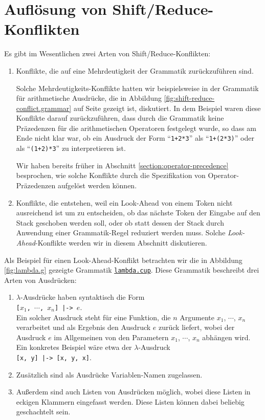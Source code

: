\section{Aufl\"osung von Shift/Reduce-Konflikten}
Es gibt im Wesentlichen zwei Arten von Shift/Reduce-Konflikten:
\begin{enumerate}
\item Konflikte, die auf eine Mehrdeutigkeit der Grammatik zur\"uckzuf\"uhren sind.

      Solche Mehrdeutigkeits-Konflikte hatten wir beispielsweise in der Grammatik f\"ur arithmetische
      Ausdr\"ucke, die in Abbildung \ref{fig:shift-reduce-conflict.grammar} auf Seite
      \pageref{fig:shift-reduce-conflict.grammar} gezeigt ist, diskutiert.  In dem Beispiel waren
      diese Konflikte darauf zur\"uckzuf\"uhren, dass durch die Grammatik keine Pr\"azedenzen f\"ur die
      arithmetischen Operatoren festgelegt wurde, so dass am Ende nicht klar war, ob ein Ausdruck
      der Form ``\texttt{1+2*3}'' als ``\texttt{1+(2*3)}'' oder als ``\texttt{(1+2)*3}'' zu
      interpretieren ist.

      Wir haben bereits fr\"uher in Abschnitt \ref{section:operator-precedence} besprochen, wie solche
      Konflikte durch die Spezifikation von Operator-Pr\"azedenzen aufgel\"ost werden k\"onnen.
\item Konflikte, die entstehen, weil ein Look-Ahead von einem Token nicht ausreichend ist um zu
      entscheiden, ob das n\"achste Token der Eingabe auf den Stack geschoben werden soll, oder 
      ob statt dessen der Stack durch Anwendung einer Grammatik-Regel reduziert werden muss.
      Solche \emph{Look-Ahead}-Konflikte   werden wir in diesem Abschnitt diskutieren.
\end{enumerate}
Als Beispiel f\"ur einen Look-Ahead-Konflikt betrachten wir die in Abbildung \ref{fig:lambda.g}
gezeigte Grammatik
\href{https://github.com/karlstroetmann/Formal-Languages/tree/master/Cup/LambdaExpr/lambda.cup}{\texttt{lambda.cup}}.  
Diese Grammatik beschreibt drei Arten von Ausdr\"ucken:
\begin{enumerate}
\item $\lambda$-Ausdr\"ucke haben syntaktisch die Form
      \\[0.2cm]
      \hspace*{1.3cm}
      \texttt{[$x_1$, $\cdots$, $x_n$] |-> $e$}.
      \\[0.2cm]
      Ein solcher Ausdruck steht f\"ur eine Funktion, die $n$ Argumente $x_1$, $\cdots$, $x_n$
      verarbeitet und als Ergebnis den Ausdruck $e$ zur\"uck liefert, wobei der Ausdruck $e$ im
      Allgemeinen von den Parametern $x_1$, $\cdots$, $x_n$ abh\"angen wird.   Ein konkretes Beispiel
      w\"are etwa der $\lambda$-Ausdruck
      \\[0.2cm]
      \hspace*{1.3cm}
      \texttt{[x, y] |-> [x, y, x]}.
\item Zus\"atzlich sind als Ausdr\"ucke Variablen-Namen zugelassen.
\item Au{\ss}erdem sind auch Listen von Ausdr\"ucken m\"oglich, wobei diese Listen in eckigen Klammern
      eingefasst werden.  Diese Listen k\"onnen dabei beliebig geschachtelt sein.
\end{enumerate}

